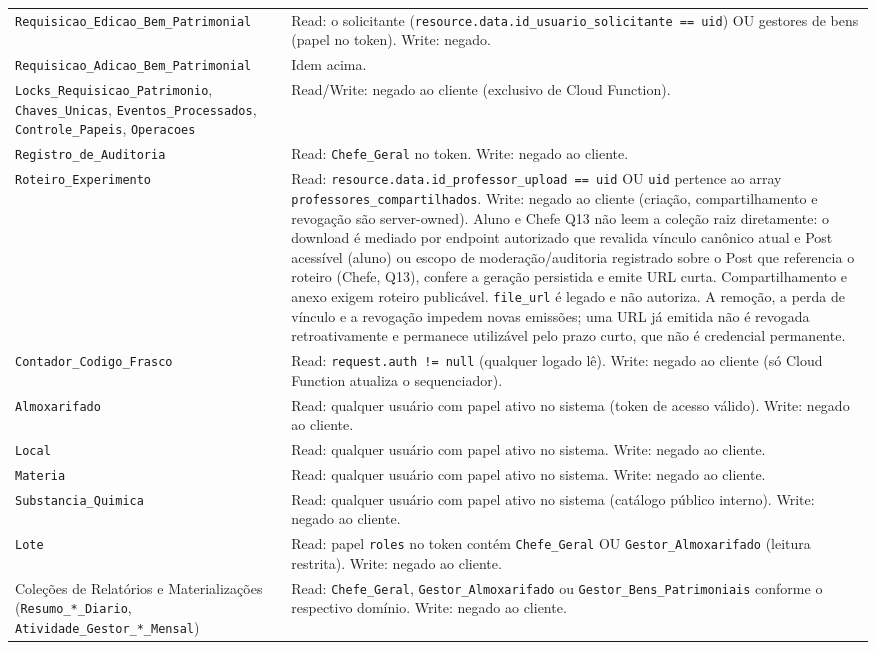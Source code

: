 \begin{longtable}{>{\raggedright\arraybackslash}p{} >{\raggedright\arraybackslash}p{}}
\texttt{Requisicao\_Edicao\_Bem\_Patrimonial} & Read: o solicitante (\texttt{resource.data.id\_usuario\_solicitante == uid}) OU gestores de bens (papel no token). Write: negado.\\
\texttt{Requisicao\_Adicao\_Bem\_Patrimonial} & Idem acima.\\
\texttt{Locks\_Requisicao\_Patrimonio}, \texttt{Chaves\_Unicas}, \texttt{Eventos\_Processados}, \texttt{Controle\_Papeis}, \texttt{Operacoes} & Read/Write: negado ao cliente (exclusivo de Cloud Function).\\
\texttt{Registro\_de\_Auditoria} & Read: \texttt{Chefe\_Geral} no token. Write: negado ao cliente.\\
\texttt{Roteiro\_Experimento} & Read: \texttt{resource.data.id\_professor\_upload == uid} OU \texttt{uid} pertence ao array \texttt{professores\_compartilhados}. Write: negado ao cliente (criação, compartilhamento e revogação são server-owned). Aluno e Chefe Q13 não leem a coleção raiz diretamente: o download é mediado por endpoint autorizado que revalida vínculo canônico atual e Post acessível (aluno) ou escopo de moderação/auditoria registrado sobre o Post que referencia o roteiro (Chefe, Q13), confere a geração persistida e emite URL curta. Compartilhamento e anexo exigem roteiro publicável. \texttt{file\_url} é legado e não autoriza. A remoção, a perda de vínculo e a revogação impedem novas emissões; uma URL já emitida não é revogada retroativamente e permanece utilizável pelo prazo curto, que não é credencial permanente.\\
\texttt{Contador\_Codigo\_Frasco} & Read: \texttt{request.auth != null} (qualquer logado lê). Write: negado ao cliente (só Cloud Function atualiza o sequenciador).\\
\texttt{Almoxarifado} & Read: qualquer usuário com papel ativo no sistema (token de acesso válido). Write: negado ao cliente.\\
\texttt{Local} & Read: qualquer usuário com papel ativo no sistema. Write: negado ao cliente.\\
\texttt{Materia} & Read: qualquer usuário com papel ativo no sistema. Write: negado ao cliente.\\
\texttt{Substancia\_Quimica} & Read: qualquer usuário com papel ativo no sistema (catálogo público interno). Write: negado ao cliente.\\
\texttt{Lote} & Read: papel \texttt{roles} no token contém \texttt{Chefe\_Geral} OU \texttt{Gestor\_Almoxarifado} (leitura restrita). Write: negado ao cliente.\\
Coleções de Relatórios e Materializações (\texttt{Resumo\_*\_Diario}, \texttt{Atividade\_Gestor\_*\_Mensal}) & Read: \texttt{Chefe\_Geral}, \texttt{Gestor\_Almoxarifado} ou \texttt{Gestor\_Bens\_Patrimoniais} conforme o respectivo domínio. Write: negado ao cliente.\\
\end{longtable}


